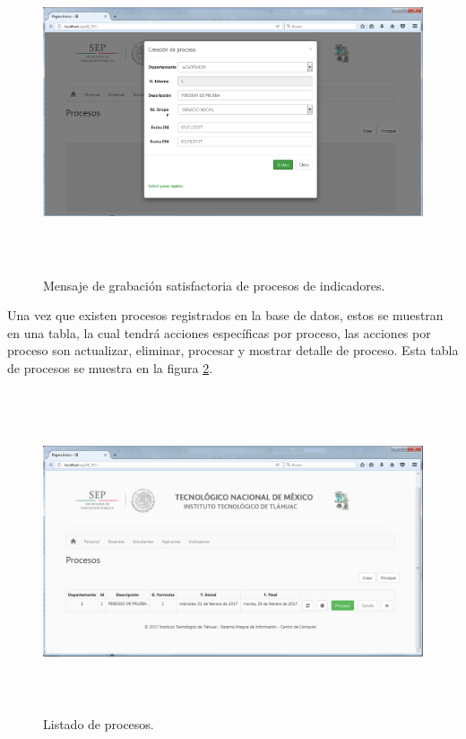		    \begin{figure}[]
		        \centering
		        \includegraphics[width=16cm, height=9.5cm]{figuras/ProcesoGraba}
		        \caption{Mensaje de grabaci\'on satisfactoria de procesos de indicadores.}
		        \label{img_ProcesoGraba}
		    \end{figure}

		    Una vez que existen procesos registrados en la base de datos, estos se muestran en una tabla, la cual tendr\'a acciones espec\'ificas por proceso, las acciones por proceso son actualizar, eliminar, procesar y mostrar detalle de proceso. Esta tabla de procesos se muestra en la figura \ref{fig_ProcesoTabla}.\\

		    \begin{figure}[]
		        \centering
		        \includegraphics[width=16cm, height=9.5cm]{figuras/ProcesoTabla}
		        \caption{Listado de procesos.}
		        \label{fig_ProcesoTabla}
		    \end{figure}
			
